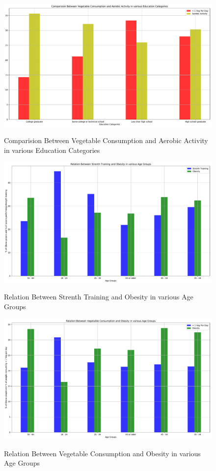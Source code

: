 \documentclass{article}
\begin{document}
\begin{figure}[h]
	\centering
	\caption{Comparision Between Vegetable Consumption and Aerobic Activity in various Education Categories}
	\includegraphics[width=\linewidth]{images/exploration_aerobic_malnutrition.pdf}
	\label{fig:aerobicVsMalnutrition}
\end{figure}
\begin{figure}[h]
	\centering
	\caption{Relation Between Strenth Training and Obesity in various Age Groups}
	\includegraphics[width=\linewidth]{images/exploration_training_obesity.pdf}
	\label{fig:trainingVsObesity}
\end{figure}
\begin{figure}[h]
	\centering
	\caption{Relation Between Vegetable Consumption and Obesity in various Age Groups}
	\includegraphics[width=\linewidth]{images/exploration_veg_malnutrition_obesity.pdf}
	\label{fig:vegMalnutritionVsObesity}
\end{figure}
\end{document}
